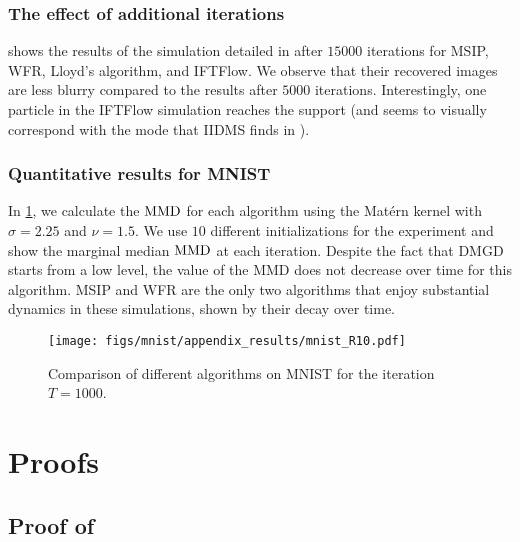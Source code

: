 \subsubsection{The effect of additional iterations}
 shows the results of the simulation detailed in  after $15000$ iterations for MSIP, WFR, Lloyd's algorithm, and IFTFlow. We observe that their recovered images are less blurry compared to the results after $5000$ iterations. Interestingly, one particle in the IFTFlow simulation reaches the support (and seems to visually correspond with the mode that IIDMS finds in ). 

\subsubsection{Quantitative results for MNIST}\label{quant:mnist}
In \cref{fig:mnist_comparison_quant}, we calculate the $\operatorname{MMD}$ for each algorithm using the Mat\'{e}rn kernel with $\sigma= 2.25$ and $\nu = 1.5$. We use $10$ different initializations for the experiment and show the marginal median $\operatorname{MMD}$ at each iteration. Despite the fact that DMGD starts from a low level, the value of the MMD does not decrease over time for this algorithm. 
 MSIP and WFR are the only two algorithms that enjoy substantial dynamics in these simulations, shown by their decay over time.

\begin{figure}[!ht]
    \centering
    \texttt{[image: figs/mnist/appendix\_results/mnist\_R10.pdf]}
    \caption{Comparison of different algorithms on MNIST for the iteration $T=1000$. }
    \label{fig:mnist_comparison_quant}
\end{figure}




\clearpage
\section{Proofs}


\subsection{Proof of \texorpdfstring{}{Theorem \ref{prop:coupled_ode_WFR}}} \label{proof:coupled_ode_WFR}







